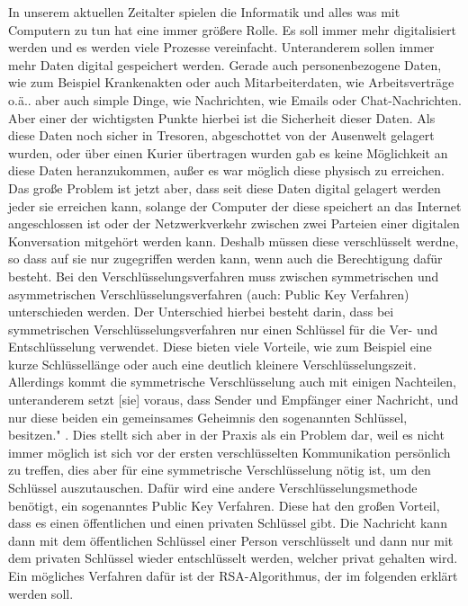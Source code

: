 \documentclass[12pt,a4paper]{scrartcl}
\begin{document}
In unserem aktuellen Zeitalter spielen die Informatik und alles was mit Computern zu tun hat eine immer größere Rolle. Es soll immer mehr digitalisiert werden und es werden viele Prozesse vereinfacht. Unteranderem sollen immer mehr Daten digital gespeichert werden. Gerade auch personenbezogene Daten, wie zum Beispiel Krankenakten oder auch Mitarbeiterdaten, wie Arbeitsverträge o.ä.. aber auch simple Dinge, wie Nachrichten, wie Emails oder Chat-Nachrichten. Aber einer der wichtigsten Punkte hierbei ist die Sicherheit dieser Daten. Als diese Daten noch sicher in Tresoren, abgeschottet von der Ausenwelt gelagert wurden, oder über einen Kurier übertragen wurden gab es keine Möglichkeit an diese Daten heranzukommen, außer es war möglich diese physisch zu erreichen. Das große Problem ist jetzt aber, dass seit diese Daten digital gelagert werden jeder sie erreichen kann, solange der Computer der diese speichert an das Internet angeschlossen ist oder der Netzwerkverkehr zwischen zwei Parteien einer digitalen Konversation mitgehört werden kann. Deshalb müssen diese verschlüsselt werdne, so dass auf sie nur zugegriffen werden kann, wenn auch die Berechtigung dafür besteht. 
Bei den Verschlüsselungsverfahren muss zwischen symmetrischen und asymmetrischen Verschlüsselungsverfahren (auch: Public Key Verfahren) unterschieden werden. Der Unterschied hierbei besteht darin, dass bei symmetrischen Verschlüsselungsverfahren nur einen Schlüssel für die Ver- und Entschlüsselung verwendet. Diese bieten viele Vorteile, wie zum Beispiel eine kurze Schlüssellänge oder auch eine deutlich kleinere Verschlüsselungszeit. Allerdings kommt die symmetrische Verschlüsselung auch mit einigen Nachteilen, unteranderem \glqq setzt [sie] voraus, dass Sender und Empfänger einer Nachricht, und nur diese beiden ein gemeinsames
Geheimnis den sogenannten Schlüssel, besitzen." \cite[S.7]{schwenk2010sicherheit}. Dies stellt sich aber in der Praxis als ein Problem dar, weil es nicht immer möglich ist sich vor der ersten verschlüsselten Kommunikation persönlich zu treffen, dies aber für eine symmetrische Verschlüsselung nötig ist, um den Schlüssel auszutauschen. Dafür wird eine andere Verschlüsselungsmethode benötigt, ein sogenanntes Public Key Verfahren. Diese hat den großen Vorteil, dass es einen öffentlichen und einen privaten Schlüssel gibt. Die Nachricht kann dann mit dem öffentlichen Schlüssel einer Person verschlüsselt und dann nur mit dem privaten Schlüssel wieder entschlüsselt werden, welcher privat gehalten wird. Ein mögliches Verfahren dafür ist der RSA-Algorithmus, der im folgenden erklärt werden soll.
\end{document}
